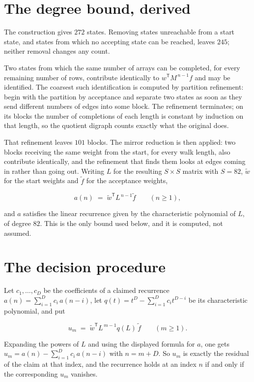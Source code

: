\documentclass[11pt]{article}
\theoremstyle{definition}
\begin{document}
\section{The degree bound, derived}

The construction gives $272$ states. Removing states unreachable from a start state, and states from which no accepting state can be reached, leaves $245$; neither removal changes any count.

Two states from which the same number of arrays can be completed, for every remaining number of rows, contribute identically to $w^{\mathsf T}M^{\,n-1}f$ and may be identified. The coarsest such identification is computed by partition refinement: begin with the partition by acceptance and separate two states as soon as they send different numbers of edges into some block. The refinement terminates; on its blocks the number of completions of each length is constant by induction on that length, so the quotient digraph counts exactly what the original does.

That refinement leaves $101$ blocks. The mirror reduction is then applied: two blocks receiving the same weight from the start, for every walk length, also contribute identically, and the refinement that finds them looks at edges coming in rather than going out. Writing $L$ for the resulting $S \times S$ matrix with $S = 82$, $\tilde w$ for the start weights and $\tilde f$ for the acceptance weights,

\[a(n) \;=\; \tilde w^{\mathsf T} L^{\,n-1} \tilde f \qquad (n \ge 1),\]

and $a$ satisfies the linear recurrence given by the characteristic polynomial of $L$, of degree $82$. This is the only bound used below, and it is computed, not assumed.

\section{The decision procedure}

Let $c_1,\dots,c_D$ be the coefficients of a claimed recurrence $a(n) = \sum_{i=1}^{D} c_i\,a(n-i)$, let $q(t) = t^{D} - \sum_{i=1}^{D} c_i t^{D-i}$ be its characteristic polynomial, and put

\[u_m \;=\; \tilde w^{\mathsf T} L^{\,m-1} q(L)\,\tilde f \qquad (m \ge 1).\]

Expanding the powers of $L$ and using the displayed formula for $a$, one gets $u_m = a(n) - \sum_{i=1}^{D} c_i\,a(n-i)$ with $n = m + D$. So $u_m$ is exactly the residual of the claim at that index, and the recurrence holds at an index $n$ if and only if the corresponding $u_m$ vanishes.
\end{document}
